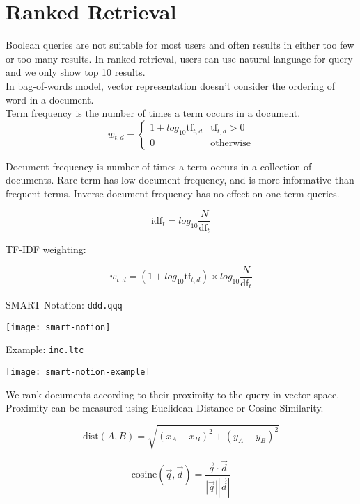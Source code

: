 \chapter{Ranked Retrieval}
\begin{multicols*}{2}

\noindent Boolean queries are not suitable for most users and often results in either too few or too many results. In ranked retrieval, users can use natural language for query and we only show top 10 results. \\

\noindent In bag-of-words model, vector representation doesn’t consider the ordering of word in a document.\\

\noindent Term frequency is the number of times a term occurs in a document. \\

$$w_{t,d} = 
\begin{cases}
    1 + log_{10} \text{tf}_{t,d} & \text{tf}_{t,d} > 0 \\
    0 & \text{otherwise}
\end{cases}
$$

\noindent Document frequency is number of times a term occurs in a collection of documents. Rare term has low document frequency, and is more informative than frequent terms. Inverse document frequency has no effect on one-term queries.

$$\text{idf}_t = log_{10} \frac{N}{\text{df}_t}$$

\noindent TF-IDF weighting: 

$$w_{t,d} = (1+ log_{10} \text{tf}_{t,d})\times log_{10} \frac{N}{\text{df}_t}$$

\noindent SMART Notation: \verb|ddd.qqq|
\begin{center}
\texttt{[image: smart-notion]}
\end{center}

\noindent Example: \verb|inc.ltc|
\begin{center}
\texttt{[image: smart-notion-example]}
\end{center}

\noindent We rank documents according to their proximity to the query in vector space. Proximity can be measured using Euclidean Distance or Cosine Similarity.

$$\text{dist}(A,B) = \sqrt{(x_A - x_B)^2 + (y_A - y_B)^2}$$

$$\text{cosine} (\vec{q},\vec{d}) = \frac{\vec{q} \cdot \vec{d}}{|\vec{q}||\vec{d}|}$$

\end{multicols*}
